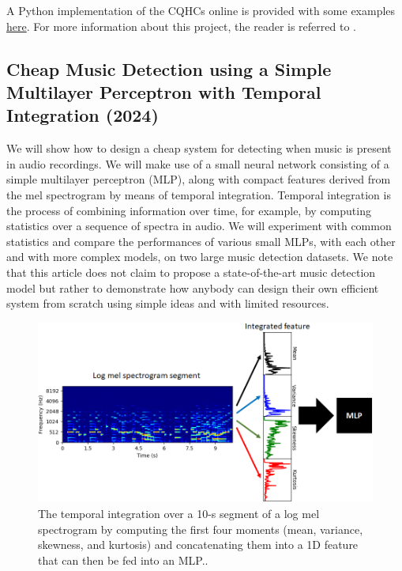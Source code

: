 \documentclass{article}
\begin{document}
A Python implementation of the CQHCs online is provided with some examples \href{https://github.com/zafarrafii/CQHC-Python}{here}. For more information about this project, the reader is referred to \cite{article_rafii_may2022}.


\subsection{Cheap Music Detection using a Simple Multilayer Perceptron with Temporal Integration (2024)}
\label{ssec:music_detection}

We will show how to design a cheap system for detecting when music is present in audio recordings. We will make use of a small neural network consisting of a simple multilayer perceptron (MLP), along with compact features derived from the mel spectrogram by means of temporal integration. Temporal integration is the process of combining information over time, for example, by computing statistics over a sequence of spectra in audio. We will experiment with common statistics and compare the performances of various small MLPs, with each other and with more complex models, on two large music detection datasets. We note that this article does not claim to propose a state-of-the-art music detection model but rather to demonstrate how anybody can design their own efficient system from scratch using simple ideas and with limited resources.

\begin{figure}[!htb]
	\centering
	\includegraphics[width=1.0\columnwidth]{Images/temporal_integration.png}
	\caption{The temporal integration over a 10-s segment of a log mel spectrogram by computing the first four moments (mean, variance, skewness, and
kurtosis) and concatenating them into a 1D feature that can then be fed into an MLP..}
	\label{fig:temporal_integration}
\end{figure}
\end{document}
